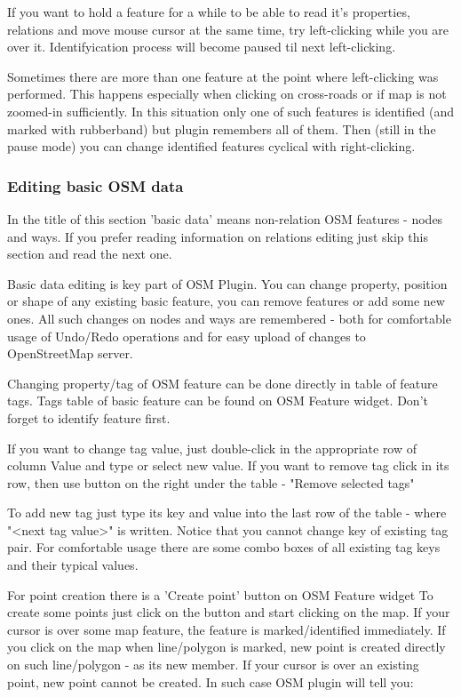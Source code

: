 If you want to hold a feature for a while to be able to read it's properties,
relations and move mouse cursor at the same time, try left-clicking while you
are over it. Identifyication process will become paused til next
left-clicking.

Sometimes there are more than one feature at the point where left-clicking
was performed. This happens especially when clicking on cross-roads or if map
is not zoomed-in sufficiently. In this situation only one of such features is
identified (and marked with rubberband) but plugin remembers all of them.
Then (still in the pause mode) you can change identified features cyclical
with right-clicking.

\subsubsection{Editing basic OSM data}

In the title of this section 'basic data' means non-relation OSM features -
nodes and ways. If you prefer reading information on relations editing just
skip this section and read the next one.
 
Basic data editing is key part of OSM Plugin. You can change property,
position or shape of any existing basic feature, you can remove features or
add some new ones. All such changes on nodes and ways are remembered - both
for comfortable usage of Undo/Redo operations and for easy upload of  changes
to OpenStreetMap server.


Changing property/tag of OSM feature can be done directly in table of feature
tags. Tags table of basic feature can be found on OSM Feature widget. Don't
forget to identify feature first.
 
If you want to change tag value, just double-click in the appropriate row of
column Value and type or select new value. If you want to remove tag click in
its row, then use button on the right under the table - "Remove selected
tags"

To add new tag just type its key and value into the last row of the table -
where "<next tag value>" is written. Notice that you cannot change key of
existing tag pair. For comfortable usage there are some combo boxes of all
existing tag keys and their typical values.


For point creation there is a 'Create point' button on OSM Feature widget   
To create some points just click on the button and start clicking on the map.
If your cursor is over some map feature, the feature is marked/identified
immediately. If you click on the map when line/polygon is marked, new point
is created directly on such line/polygon - as its new member.
If your cursor is over an existing point, new point cannot be created.
In such case OSM plugin will tell you:

